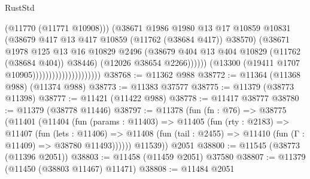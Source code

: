 \begin{lexlean}{RustStd}
\begin{coremodule}
                                                  (@11770 (@11771 @10908)))
                                                (@38671
                                                  @1986
                                                  @1980
                                                  @13
                                                  @17
                                                  @10859
                                                  @10831
                                                  (@38679
                                                    @417
                                                    @13
                                                    @417
                                                    @10859
                                                    (@11762 (@38684 @417))
                                                    @38570)
                                                  (@38671
                                                    @1978
                                                    @125
                                                    @13
                                                    @16
                                                    @10829
                                                    @2496
                                                    (@38679
                                                      @404
                                                      @13
                                                      @404
                                                      @10829
                                                      (@11762 (@38684 @404))
                                                      @38446)
                                                    (@12026 @38654 @2266))))))
                                          (@13300 (@19411 @1707 @10905)))))))))))))))))))))
@38768 := @11362 @988
@38772 := @11364 (@11368 @988) (@11374 @988)
@38773 := @11383 @37577
@38775 := @11379 (@38773 @11398)
@38777 := @11421 (@11422 @988)
@38778 := @11417 @38777
@38780 := @11379 (@38778 @11446)
@38797 := @11378
    (fun (fn : @76) =>
    @38775
      (@11401
        (@11404
          (fun (params : @11403) =>
          @11405
            (fun (rty : @2183) =>
            @11407
              (fun (lets : @11406) =>
              @11408 (fun (tail : @2455) => @11410 (fun (Γ : @11409) => @38780 @11493))))))
        @11539))
    @2051
@38800 := @11545 (@38773 (@11396 @2051))
@38803 := @11458 (@11459 @2051) @37580
@38807 := @11379 (@11450 (@38803 @11467) @11471)
@38808 := @11484 @2051

\end{coremodule}
\end{lexlean}

